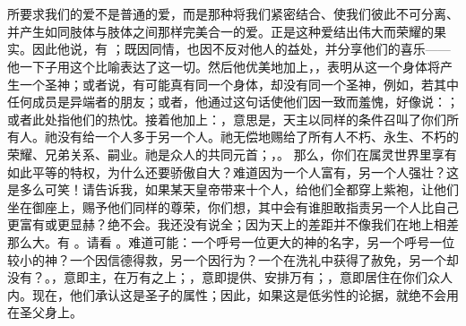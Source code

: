 

\section{}

\par

\par

所要求我们的爱不是普通的爱，而是那种将我们紧密结合、使我们彼此不可分离、并产生如同肢体与肢体之间那样完美合一的爱。正是这种爱结出伟大而荣耀的果实。因此他说，有 ；既因同情，也因不反对他人的益处，并分享他们的喜乐——他一下子用这个比喻表达了这一切。然后他优美地加上，，表明从这一个身体将产生一个圣神；或者说，有可能真有同一个身体，却没有同一个圣神，例如，若其中任何成员是异端者的朋友；或者，他通过这句话使他们因一致而羞愧，好像说：；或者此处指他们的热忱。接着他加上：，意思是，天主以同样的条件召叫了你们所有人。祂没有给一个人多于另一个人。祂无偿地赐给了所有人不朽、永生、不朽的荣耀、兄弟关系、嗣业。祂是众人的共同元首；，。 那么，你们在属灵世界里享有如此平等的特权，为什么还要骄傲自大？难道因为一个人富有，另一个人强壮？这是多么可笑！请告诉我，如果某天皇帝带来十个人，给他们全都穿上紫袍，让他们坐在御座上，赐予他们同样的尊荣，你们想，其中会有谁胆敢指责另一个人比自己更富有或更显赫？绝不会。我还没有说全；因为天上的差距并不像我们在地上相差那么大。有 。请看 。难道可能：一个呼号一位更大的神的名字，另一个呼号一位较小的神？一个因信德得救，另一个因行为？一个在洗礼中获得了赦免，另一个却没有？。，意即主，在万有之上；，意即提供、安排万有；，意即居住在你们众人内。现在，他们承认这是圣子的属性；因此，如果这是低劣性的论据，就绝不会用在圣父身上。\par

